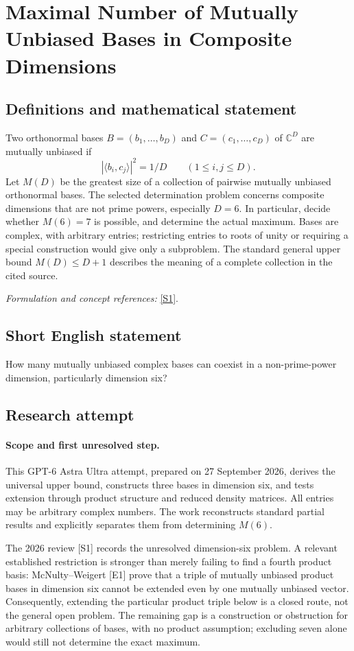 \documentclass[11pt]{article}
\begin{document}
\section*{\texorpdfstring{Maximal Number of Mutually Unbiased Bases in Composite Dimensions}{Maximal Number of Mutually Unbiased Bases in Composite Dimensions}}\label{435}
\subsection{Definitions and mathematical statement}
Two orthonormal bases $B=(b_1,\ldots,b_D)$ and $C=(c_1,\ldots,c_D)$ of ${\mathbb{C}}^D$ are mutually unbiased if
\[
 |\langle b_i,c_j\rangle|^2=1/D\qquad(1\le i,j\le D).
\]
Let $M(D)$ be the greatest size of a collection of pairwise mutually unbiased orthonormal bases. The selected determination problem concerns composite dimensions that are not prime powers, especially $D=6$. In particular, decide whether $M(6)=7$ is possible, and determine the actual maximum. Bases are complex, with arbitrary entries; restricting entries to roots of unity or requiring a special construction would give only a subproblem. The standard general upper bound $M(D)\le D+1$ describes the meaning of a complete collection in the cited source.
\par\smallskip\textit{Formulation and concept references:} \href{https://quantum-journal.org/papers/q-2026-04-01-2051/}{[S1]}.

\subsection{Short English statement}
How many mutually unbiased complex bases can coexist in a non-prime-power dimension, particularly dimension six?
\subsection{Research attempt}
\paragraph{Scope and first unresolved step.}
This GPT-6 Astra Ultra attempt, prepared on 27 September 2026, derives the universal upper bound, constructs three bases in dimension six, and tests extension through product structure and reduced density matrices. All entries may be arbitrary complex numbers. The work reconstructs standard partial results and explicitly separates them from determining $M(6)$.

The 2026 review [S1] records the unresolved dimension-six problem. A relevant established restriction is stronger than merely failing to find a fourth product basis: McNulty--Weigert [E1] prove that a triple of mutually unbiased product bases in dimension six cannot be extended even by one mutually unbiased vector. Consequently, extending the particular product triple below is a closed route, not the general open problem. The remaining gap is a construction or obstruction for arbitrary collections of bases, with no product assumption; excluding seven alone would still not determine the exact maximum.
\end{document}
